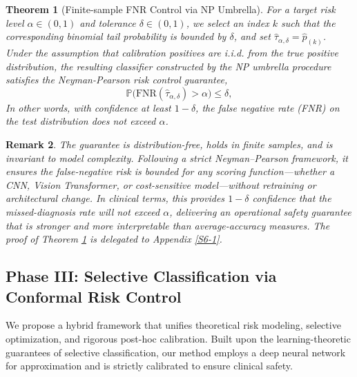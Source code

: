 \documentclass[journal,twoside,web]{ieeecolor}
\newtheorem{theorem}{Theorem}[section]
\newtheorem{remark}[theorem]{Remark}
\begin{document}
\begin{theorem}[Finite-sample FNR Control via NP Umbrella]\label{Th1}
For a target risk level $\alpha\in(0,1)$ and tolerance $\delta\in(0,1)$, we select an index $k$ such that the corresponding binomial tail probability is bounded by $\delta$, and set $\hat{\tau}_{\alpha,\delta} = \hat{p}_{(k)}$. Under the assumption that calibration positives are i.i.d. from the true positive distribution, the resulting classifier constructed by the NP umbrella procedure satisfies the Neyman-Pearson risk control guarantee,
\[
\mathbb{P}\bigl(\mathrm{FNR}(\hat{\tau}_{\alpha,\delta}) > \alpha\bigr)
\leq \delta,
\]
In other words, with confidence at least $1-\delta$, the false negative rate (FNR) on the test distribution does not exceed $\alpha$.
\end{theorem}

\begin{remark}
The guarantee is distribution-free, holds in finite samples, and is invariant to model complexity. Following a strict Neyman--Pearson framework, it ensures the false-negative risk is bounded for any scoring function---whether a CNN, Vision Transformer, or cost-sensitive model---without retraining or architectural change. In clinical terms, this provides $1-\delta$ confidence that the missed-diagnosis rate will not exceed $\alpha$, delivering an operational safety guarantee that is stronger and more interpretable than average-accuracy measures. The proof of Theorem \ref{Th1} is delegated to Appendix \ref{S6-1}.
\end{remark}


\subsection{Phase III: Selective Classification via Conformal Risk Control}\label{sec:phase3_method}

We propose a hybrid framework that unifies theoretical risk modeling, selective optimization, and rigorous post-hoc calibration. Built upon the learning-theoretic guarantees of selective classification, our method employs a deep neural network for approximation and is strictly calibrated to ensure clinical safety.
\end{document}
